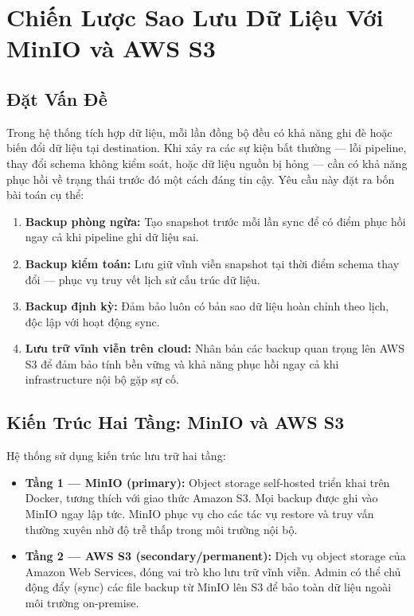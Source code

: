 \newpage
\section{Chiến Lược Sao Lưu Dữ Liệu Với MinIO và AWS S3}
\label{backup}

\subsection{Đặt Vấn Đề}

Trong hệ thống tích hợp dữ liệu, mỗi lần đồng bộ đều có khả năng ghi đè
hoặc biến đổi dữ liệu tại destination. Khi xảy ra các sự kiện bất thường —
lỗi pipeline, thay đổi schema không kiểm soát, hoặc dữ liệu nguồn bị hỏng —
cần có khả năng phục hồi về trạng thái trước đó một cách đáng tin cậy.
Yêu cầu này đặt ra bốn bài toán cụ thể:

\begin{enumerate}
    \item \textbf{Backup phòng ngừa:} Tạo snapshot trước mỗi lần sync để có
    điểm phục hồi ngay cả khi pipeline ghi dữ liệu sai.
    \item \textbf{Backup kiểm toán:} Lưu giữ vĩnh viễn snapshot tại thời điểm
    schema thay đổi — phục vụ truy vết lịch sử cấu trúc dữ liệu.
    \item \textbf{Backup định kỳ:} Đảm bảo luôn có bản sao dữ liệu hoàn chỉnh
    theo lịch, độc lập với hoạt động sync.
    \item \textbf{Lưu trữ vĩnh viễn trên cloud:} Nhân bản các backup quan trọng
    lên AWS S3 để đảm bảo tính bền vững và khả năng phục hồi ngay cả khi
    infrastructure nội bộ gặp sự cố.
\end{enumerate}

\subsection{Kiến Trúc Hai Tầng: MinIO và AWS S3}

Hệ thống sử dụng kiến trúc lưu trữ hai tầng:

\begin{itemize}
    \item \textbf{Tầng 1 — MinIO (primary):} Object storage self-hosted triển
    khai trên Docker, tương thích với giao thức Amazon S3. Mọi backup được ghi
    vào MinIO ngay lập tức. MinIO phục vụ cho các tác vụ restore và truy vấn
    thường xuyên nhờ độ trễ thấp trong môi trường nội bộ.
    \item \textbf{Tầng 2 — AWS S3 (secondary/permanent):} Dịch vụ object
    storage của Amazon Web Services, đóng vai trò kho lưu trữ vĩnh viễn. Admin
    có thể chủ động đẩy (sync) các file backup từ MinIO lên S3 để bảo toàn
    dữ liệu ngoài môi trường on-premise.
\end{itemize}

